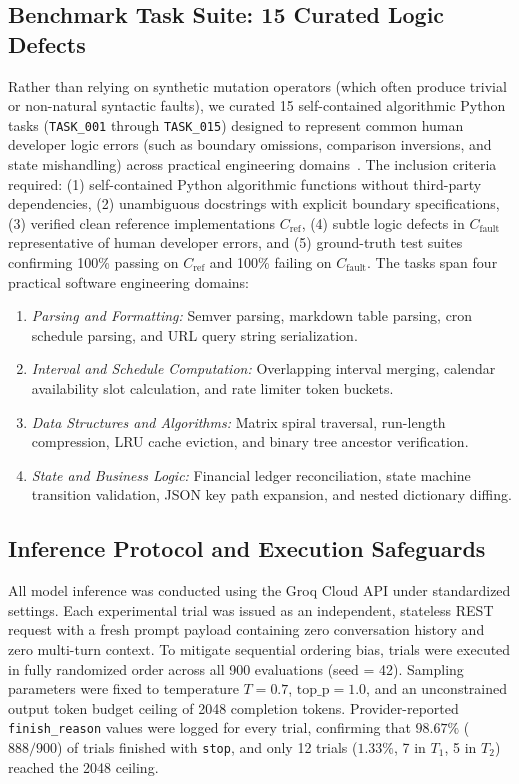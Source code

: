 \documentclass[11pt,a4paper]{article}
\begin{document}
\subsection{Benchmark Task Suite: 15 Curated Logic Defects}
Rather than relying on synthetic mutation operators (which often produce trivial or non-natural syntactic faults), we curated 15 self-contained algorithmic Python tasks (\texttt{TASK\_001} through \texttt{TASK\_015}) designed to represent common human developer logic errors (such as boundary omissions, comparison inversions, and state mishandling) across practical engineering domains~\cite{zhu2025survey,just2014defects4j}. The inclusion criteria required: (1) self-contained Python algorithmic functions without third-party dependencies, (2) unambiguous docstrings with explicit boundary specifications, (3) verified clean reference implementations $C_{\text{ref}}$, (4) subtle logic defects in $C_{\text{fault}}$ representative of human developer errors, and (5) ground-truth test suites confirming 100\% passing on $C_{\text{ref}}$ and 100\% failing on $C_{\text{fault}}$.
The tasks span four practical software engineering domains:
\begin{enumerate}
    \item \textit{Parsing and Formatting:} Semver parsing, markdown table parsing, cron schedule parsing, and URL query string serialization.
    \item \textit{Interval and Schedule Computation:} Overlapping interval merging, calendar availability slot calculation, and rate limiter token buckets.
    \item \textit{Data Structures and Algorithms:} Matrix spiral traversal, run-length compression, LRU cache eviction, and binary tree ancestor verification.
    \item \textit{State and Business Logic:} Financial ledger reconciliation, state machine transition validation, JSON key path expansion, and nested dictionary diffing.
\end{enumerate}

\subsection{Inference Protocol and Execution Safeguards}
All model inference was conducted using the Groq Cloud API under standardized settings. Each experimental trial was issued as an independent, stateless REST request with a fresh prompt payload containing zero conversation history and zero multi-turn context. To mitigate sequential ordering bias, trials were executed in fully randomized order across all 900 evaluations (seed = 42). Sampling parameters were fixed to temperature $T = 0.7$, $\text{top\_p} = 1.0$, and an unconstrained output token budget ceiling of 2048 completion tokens. Provider-reported \texttt{finish\_reason} values were logged for every trial, confirming that $98.67\%$ ($888/900$) of trials finished with \texttt{stop}, and only 12 trials ($1.33\%$, 7 in $T_1$, 5 in $T_2$) reached the 2048 ceiling.
\end{document}
